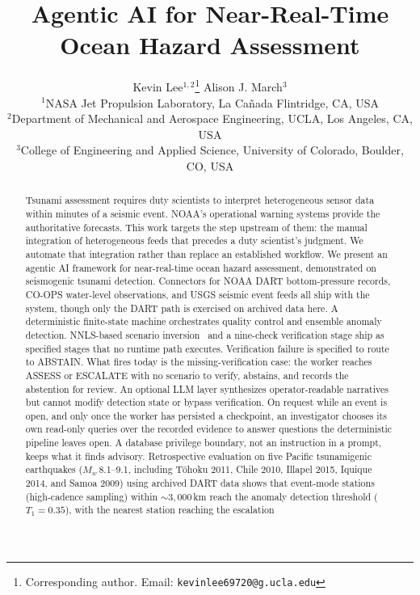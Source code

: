 \documentclass{article}
\title{Agentic AI for Near-Real-Time Ocean Hazard Assessment}
\author{%
  Kevin Lee\orcidlink{0009-0004-0388-9260}$^{1,2}$\thanks{Corresponding author. Email: \texttt{kevinlee69720@g.ucla.edu}} \quad
  Alison J. March\orcidlink{0009-0000-3643-8061}$^{3}$ \\[4pt]
  $^1$NASA Jet Propulsion Laboratory, La Ca\~{n}ada Flintridge, CA, USA \\
  $^2$Department of Mechanical and Aerospace Engineering, UCLA, Los Angeles, CA, USA \\
  $^3$College of Engineering and Applied Science, University of Colorado, Boulder, CO, USA \\
}
\begin{document}
\maketitle



\begin{abstract}
Tsunami assessment requires duty scientists to interpret
heterogeneous sensor data within minutes of a seismic event.
NOAA's operational warning systems provide the authoritative
forecasts.  This work targets the step upstream of them: the manual
integration of heterogeneous feeds that precedes a duty scientist's
judgment.  We automate that integration rather than replace an
established workflow.
We present an agentic AI framework for near-real-time ocean
hazard assessment, demonstrated on seismogenic tsunami detection.
Connectors for NOAA DART bottom-pressure records, CO-OPS water-level
observations, and USGS seismic event feeds all ship with the system,
though only the DART path is exercised on archived data here.  A
deterministic finite-state machine orchestrates quality control and
ensemble anomaly detection.  NNLS-based scenario
inversion~\citep{lawson1974solving, percival2011extraction} and a
nine-check verification stage ship as specified stages that no runtime
path executes.
Verification failure is specified to route to ABSTAIN.  What fires
today is the missing-verification case: the worker reaches ASSESS or
ESCALATE with no scenario to verify, abstains, and records the
abstention for review.
An optional LLM layer synthesizes operator-readable narratives but
cannot modify detection state or bypass verification.  On request while
an event is open, and only once the worker has persisted a checkpoint,
an investigator chooses its own read-only queries over the recorded
evidence to answer questions the deterministic pipeline leaves open.
A database privilege boundary, not an instruction in a prompt, keeps
what it finds advisory.
Retrospective evaluation on five Pacific tsunamigenic earthquakes
($M_w$\,8.1--9.1, including T\={o}hoku 2011, Chile 2010,
Illapel 2015, Iquique 2014, and Samoa 2009) using archived DART
data shows that event-mode stations (high-cadence sampling) within
${\sim}3{,}000$\,km reach the anomaly detection threshold
($T_1{=}0.35$), with the nearest station reaching the escalation

\end{abstract}
\end{document}
